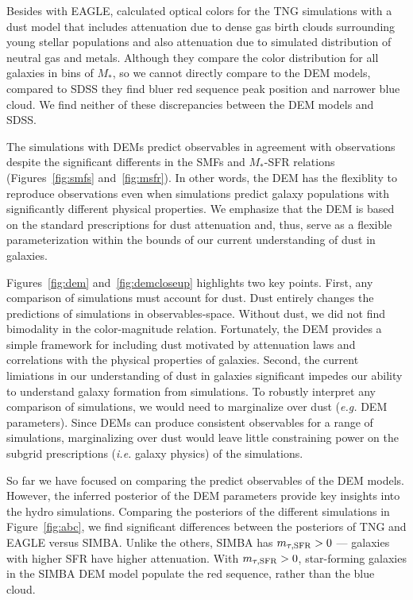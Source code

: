 Besides with EAGLE, \cite{nelson2018} calculated optical colors for the
TNG simulations with a dust model that includes attenuation due to dense gas 
birth clouds surrounding young stellar populations and also attenuation due to 
simulated distribution of neutral gas and metals.
Although they compare the color distribution for all galaxies in bins of $M_*$,
so we cannot directly compare to the DEM models, compared to SDSS they find 
bluer red sequence peak position and narrower blue cloud. We find neither of
these discrepancies between the DEM models and SDSS. 

The simulations with DEMs predict observables in agreement with observations 
despite the significant differents in the SMFs and $M_*$-SFR relations 
(Figures~\ref{fig:smfs} and~\ref{fig:msfr}). In other words, the DEM has the 
flexiblity to reproduce observations even when simulations predict galaxy
populations with significantly different physical properties. We emphasize that
the DEM is based on the standard prescriptions for dust attenuation and, thus,
serve as a flexible parameterization within the bounds of our current
understanding of dust in galaxies.

Figures~\ref{fig:dem} and~\ref{fig:demcloseup} highlights two key points. First, any comparison of
simulations must account for dust. Dust entirely changes the predictions of
simulations in observables-space. Without dust, we did not find bimodality in
the color-magnitude relation.
Fortunately, the DEM provides a simple framework
for including dust motivated by attenuation laws and correlations with the
physical properties of galaxies. 
Second, the current limiations in our understanding of dust in galaxies 
significant impedes our ability to understand galaxy formation from simulations. 
To robustly interpret any comparison of simulations, we would need to
marginalize over dust (\emph{e.g.} DEM parameters). Since DEMs can produce
consistent observables for a range of simulations, marginalizing over dust
would leave little constraining power on the subgrid prescriptions (\emph{i.e.}
galaxy physics) of the simulations. 

So far we have focused on comparing the predict observables of the DEM models.
However, the inferred posterior of the DEM parameters provide key insights into 
the hydro simulations. Comparing the posteriors of the different simulations in
Figure~\ref{fig:abc}, we find significant differences between the posteriors of TNG and EAGLE versus
SIMBA. Unlike the others, SIMBA has $m_{\tau,{\rm SFR}} > 0$ --- \ie galaxies with higher SFR
have higher attenuation. With $m_{\tau,{\rm SFR}} > 0$, star-forming galaxies in the SIMBA
DEM model populate the red sequence, rather than the blue cloud. 



